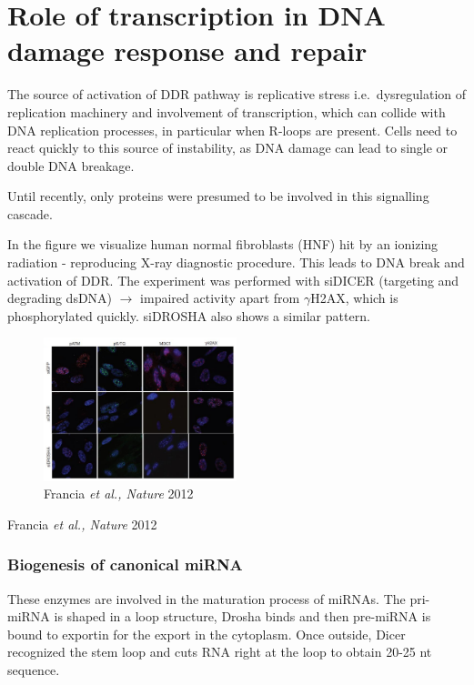 \graphicspath{{chapters/_resources/}}

\chapter{Role of transcription in DNA damage response and repair}

The source of activation of DDR pathway is replicative stress i.e.~dysregulation of replication machinery and involvement of transcription, which can collide with DNA replication processes, in particular when R-loops are present. Cells need to react quickly to this source of instability, as DNA damage can lead to single or double DNA breakage.

Until recently, only proteins were presumed to be involved in this signalling cascade.

In the figure we visualize human normal fibroblasts (HNF) hit by an ionizing radiation - reproducing X-ray diagnostic procedure. This leads to DNA break and activation of DDR. The experiment was performed with siDICER (targeting and degrading dsDNA) $\rightarrow$ impaired activity apart from \(\gamma\)H2AX, which is phosphorylated quickly. siDROSHA also shows a similar pattern.

\begin{figure}
\centering
\includegraphics[width=0.5\textwidth]{Screen_Shot_2022-12-07_at_08-58-00.png}
\caption{Francia \emph{et al., Nature} 2012}
\end{figure}

Francia \emph{et al., Nature} 2012

\hypertarget{biogenesis-of-canonical-mirna}{%
\subsection{Biogenesis of canonical miRNA}\label{biogenesis-of-canonical-mirna}}

These enzymes are involved in the maturation process of miRNAs. The pri-miRNA is shaped in a loop structure, Drosha binds and then pre-miRNA is bound to exportin for the export in the cytoplasm. Once outside, Dicer recognized the stem loop and cuts RNA right at the loop to obtain 20-25 nt sequence.

